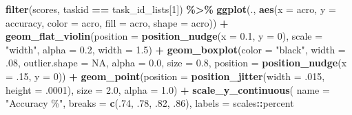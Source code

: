 \documentclass[
]{book}
\newenvironment{Shaded}{\begin{snugshade}}{\end{snugshade}}
\newcommand{\AttributeTok}[1]{\textcolor[rgb]{0.13,0.29,0.53}{#1}}
\newcommand{\ConstantTok}[1]{\textcolor[rgb]{0.56,0.35,0.01}{#1}}
\newcommand{\DecValTok}[1]{\textcolor[rgb]{0.00,0.00,0.81}{#1}}
\newcommand{\FloatTok}[1]{\textcolor[rgb]{0.00,0.00,0.81}{#1}}
\newcommand{\FunctionTok}[1]{\textcolor[rgb]{0.13,0.29,0.53}{\textbf{#1}}}
\newcommand{\NormalTok}[1]{#1}
\newcommand{\SpecialCharTok}[1]{\textcolor[rgb]{0.81,0.36,0.00}{\textbf{#1}}}
\newcommand{\StringTok}[1]{\textcolor[rgb]{0.31,0.60,0.02}{#1}}
\begin{document}
\begin{Shaded}
\begin{Highlighting}[]
\FunctionTok{filter}\NormalTok{(scores, taskid }\SpecialCharTok{==}\NormalTok{ task\_id\_lists[}\DecValTok{1}\NormalTok{]) }\SpecialCharTok{\%\textgreater{}\%}
  \FunctionTok{ggplot}\NormalTok{(., }\FunctionTok{aes}\NormalTok{(}\AttributeTok{x =}\NormalTok{ acro, }\AttributeTok{y =}\NormalTok{ accuracy, }\AttributeTok{color =}\NormalTok{ acro,}
                \AttributeTok{fill =}\NormalTok{ acro, }\AttributeTok{shape =}\NormalTok{ acro)) }\SpecialCharTok{+}
  \FunctionTok{geom\_flat\_violin}\NormalTok{(}\AttributeTok{position =} \FunctionTok{position\_nudge}\NormalTok{(}\AttributeTok{x =} \FloatTok{0.1}\NormalTok{, }\AttributeTok{y =} \DecValTok{0}\NormalTok{),}
                   \AttributeTok{scale =} \StringTok{"width"}\NormalTok{, }\AttributeTok{alpha =} \FloatTok{0.2}\NormalTok{, }\AttributeTok{width =} \FloatTok{1.5}\NormalTok{) }\SpecialCharTok{+}
  \FunctionTok{geom\_boxplot}\NormalTok{(}\AttributeTok{color =} \StringTok{"black"}\NormalTok{, }\AttributeTok{width =}\NormalTok{ .}\DecValTok{08}\NormalTok{, }\AttributeTok{outlier.shape =} \ConstantTok{NA}\NormalTok{, }\AttributeTok{alpha =} \FloatTok{0.0}\NormalTok{,}
               \AttributeTok{size =} \FloatTok{0.8}\NormalTok{, }\AttributeTok{position =} \FunctionTok{position\_nudge}\NormalTok{(}\AttributeTok{x =}\NormalTok{ .}\DecValTok{15}\NormalTok{, }\AttributeTok{y =} \DecValTok{0}\NormalTok{)) }\SpecialCharTok{+}
  \FunctionTok{geom\_point}\NormalTok{(}\AttributeTok{position =} \FunctionTok{position\_jitter}\NormalTok{(}\AttributeTok{width =}\NormalTok{ .}\DecValTok{015}\NormalTok{, }\AttributeTok{height =}\NormalTok{ .}\DecValTok{0001}\NormalTok{),}
             \AttributeTok{size =} \FloatTok{2.0}\NormalTok{, }\AttributeTok{alpha =} \FloatTok{1.0}\NormalTok{) }\SpecialCharTok{+}
  \FunctionTok{scale\_y\_continuous}\NormalTok{(}
    \AttributeTok{name =} \StringTok{"Accuracy \%"}\NormalTok{,}
    \AttributeTok{breaks =} \FunctionTok{c}\NormalTok{(.}\DecValTok{74}\NormalTok{, .}\DecValTok{78}\NormalTok{, .}\DecValTok{82}\NormalTok{, .}\DecValTok{86}\NormalTok{),}
    \AttributeTok{labels =}\NormalTok{ scales}\SpecialCharTok{::}\NormalTok{percent}


\end{Highlighting}
\end{Shaded}
\end{document}
